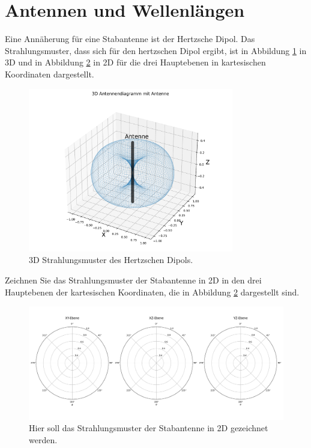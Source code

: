\section{Antennen und Wellenlängen}

Eine Annäherung für eine Stabantenne ist der Hertzsche Dipol. Das Strahlungsmuster, dass sich für den hertzschen Dipol ergibt, ist in Abbildung \ref{3d_pattern} in 3D und in Abbildung \ref{2d_pattern} in 2D für die drei Hauptebenen in kartesischen Koordinaten dargestellt.

\begin{figure}[H]
    \centering
    \includegraphics[width=0.8\textwidth]{images/3d_radiation_pattern.pdf}
    \caption{3D Strahlungsmuster des Hertzschen Dipols.}
    \label{3d_pattern}
\end{figure}

\begin{aufgabe}
Zeichnen Sie das Strahlungsmuster der Stabantenne in 2D in den drei Hauptebenen der kartesischen Koordinaten, die in Abbildung \ref{2d_pattern} dargestellt sind.
\end{aufgabe}
\begin{figure}[H]
    \centering
    \includegraphics[width=.95\textwidth]{images/polar_radiation_pattern_empty.pdf}
    \caption{Hier soll das Strahlungsmuster der Stabantenne in 2D gezeichnet werden.}
    \label{2d_pattern}
\end{figure}

